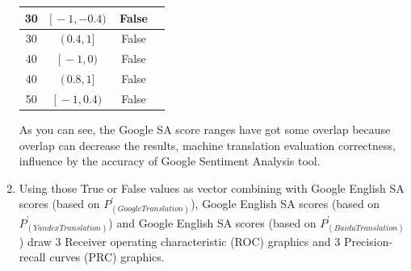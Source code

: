 \documentclass[conference]{IEEEtran}
\begin{document}
\begin{CJK*}{UTF8}{gbsn}
\begin{enumerate}
\begin{table}[h]
\begin{center}
\begin{tabular}{|c|c|c|c|}
        \hline
        30 & $[ \, -1, -0.4) \,$ & False \\
        \hline
        30 & $( \, 0.4, 1] \,$ & False \\
        \hline
        40 & $[ \, -1, 0) \,$ & False \\
        \hline
        40 & $( \, 0.8, 1] \,$ & False \\
        \hline
        50 & $[ \, -1, 0.4) \,$ & False \\
        \hline
        \hline
      \end{tabular}
    \end{center}
  \end{table}

    As you can see, the Google SA score ranges have got some overlap because
    overlap can decrease the results, machine translation evaluation
    correctness, influence by the accuracy of Google Sentiment Analysis tool.
  \item Using those True or False values as vector combining with Google English
    SA scores (based on $P^{\prime}_{(Google Translation)}$), Google English SA
    scores (based on $ P^{\prime}_{(Yandex Translation)}$) and Google English SA
    scores (based on $P^{\prime}_{(Baidu Translation)}$) draw 3 Receiver operating
    characteristic (ROC) graphics and 3 Precision-recall curves (PRC) graphics.


\end{enumerate}
\end{CJK*}
\end{document}
